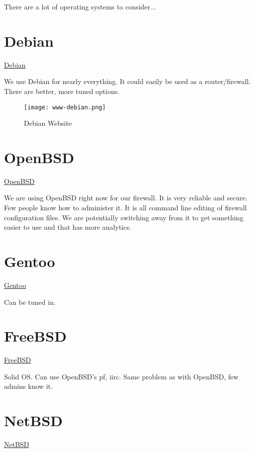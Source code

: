 %
%
%
%
%
There are a lot of operating systems to consider...


\section{Debian}
 \href{https://www.debian.org/}{Debian}

We use Debian for nearly everything. It could easily be used as a router/firewall. There are better, more tuned options.

\begin{figure}[h!]
\texttt{[image: www-debian.png]}
 \caption{Debian Website}
 \label{fig:www-debian}
\end{figure}


\section{OpenBSD}
 \href{https://www.openbsd.org/}{OpenBSD}

We are using OpenBSD right now for our firewall. It is very reliable and secure. Few people know how to administer it. It is all command line editing of
firewall configuration files. We are potentially switching away from it to get something easier to use and that has more analytics.


\section{Gentoo}
 \href{https://www.gentoo.org/}{Gentoo}

Can be tuned in.


\section{FreeBSD}
 \href{https://www.freebsd.org/}{FreeBSD}

Solid OS. Can use OpenBSD's pf, iirc. Same problem as with OpenBSD, few admins know it.


\section{NetBSD}
 \href{https://www.netbsd.org/}{NetBSD}

